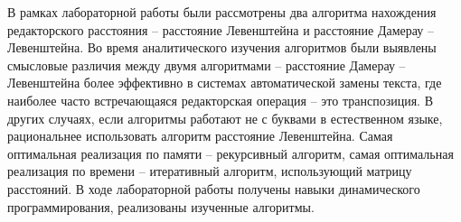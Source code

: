 \Conclusion %

В рамках лабораторной работы были рассмотрены два алгоритма нахождения редакторского расстояния -- расстояние Левенштейна и расстояние Дамерау -- Левенштейна. Во время аналитического изучения алгоритмов были выявлены смысловые различия между двумя алгоритмами -- расстояние Дамерау -- Левенштейна более эффективно в системах автоматической замены текста, где наиболее часто встречающаяся редакторская операция -- это транспозиция. В других случаях, если алгоритмы работают не с буквами в естественном языке, рациональнее использовать алгоритм расстояние Левенштейна. 
Самая оптимальная реализация по памяти -- рекурсивный алгоритм, самая оптимальная реализация по времени -- итеративный алгоритм, использующий матрицу расстояний. 
В ходе лабораторной работы получены навыки динамического программирования, реализованы изученные алгоритмы.

